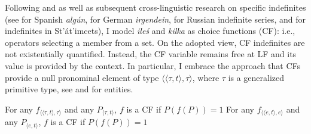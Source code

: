 \documentclass[output=paper,
]{langscibook}
\begin{document}
	\largerpage
	Following \cite{reinhart1997quantifier} and \citet{kratzer1998scope} as well as subsequent cross-linguistic research on specific indefinites (see \citealt{alonso-ovalle_menendez-benito2003some} for Spanish \textit{algún}, \citealt{kratzer_shimoyama2002indeterminate} for German \textit{irgendein}, \citealt{yanovich2005choice} for Russian indefinite series, and \citealt{matthewson1998interpretation} for indefinites in St’át’imcets), I model \textit{ileś} and \textit{kilka} as choice functions (CF): i.e., operators selecting a member from a set. On the adopted view, CF indefinites are not existentially quantified. Instead, the CF variable remains free at LF and its value is provided by the context. In particular, I embrace the approach that CFs provide a null pronominal element of type $\langle \langle \tau,t\rangle,\tau \rangle$, where $\tau$ is a generalized primitive type, see  and  for entities.





 \ea \ea For any $f_{\langle \langle \tau,t\rangle,\tau\rangle}$ and any $P_{\langle \tau,t\rangle}$, $f$ is a CF if $P(f(P))=1$\label{ex:cf-generalized}
 \ex For any $f_{\langle \langle e,t\rangle,e\rangle}$ and any $P_{\langle e,t\rangle}$, $f$ is a CF if $P(f(P))=1$\label{ex:cf-individuals}
 \z\z
\end{document}
